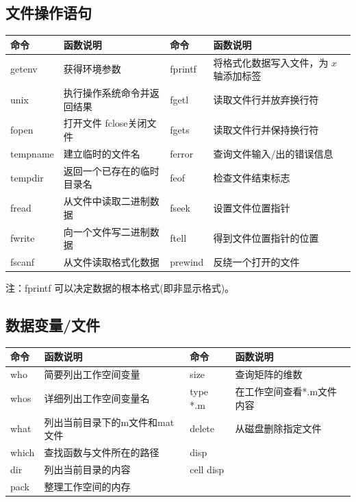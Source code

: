     \subsection{文件操作语句}
        \begin{table}[H]
          \begin{tabularx}{\textwidth}{lllX}%
            \toprule
            命令 & 函数说明 & 命令 & 函数说明 \\
            \midrule
            getenv  &  获得环境参数 & fprintf & 将格式化数据写入文件，为 $x$ 轴添加标签 \\
            unix  &  执行操作系统命令并返回结果&  fgetl & 读取文件行并放弃换行符\\
            fopen  &  打开文件 fclose关闭文件  &fgets & 读取文件行并保持换行符\\
            tempname  &  建立临时的文件名  &ferror & 查询文件输入/出的错误信息\\
            tempdir  &  返回一个已存在的临时目录名 &feof&  检查文件结束标志\\
            fread  &  从文件中读取二进制数据&  fseek  &设置文件位置指针\\
            fwrite  &  向一个文件写二进制数据 &ftell   & 得到文件位置指针的位置\\
            fscanf  &  从文件读取格式化数据 & prewind   & 反绕一个打开的文件\\
            \bottomrule
            \end{tabularx}
          \end{table}
        \noindent 注：fprintf 可以决定数据的根本格式(即非显示格式)。
    \subsection{数据变量/文件}
          \begin{table}[H]
            \centering
          \begin{tabular}{llll}%
            \toprule
            命令 & 函数说明&命令 & 函数说明\\
            \midrule
            who  &  简要列出工作空间变量&size  &查询矩阵的维数\\
            whos  &  详细列出工作空间变量名&type *.m  &在工作空间查看*.m文件内容\\
            what   & 列出当前目录下的m文件和mat文件&delete  &从磁盘删除指定文件\\
            which &查找函数与文件所在的路径&disp  &{}\\
            dir &列出当前目录的内容&cell disp&{}  \\
            pack  &整理工作空间的内存&{} &\\
            \bottomrule
            \end{tabular}
          \end{table}
